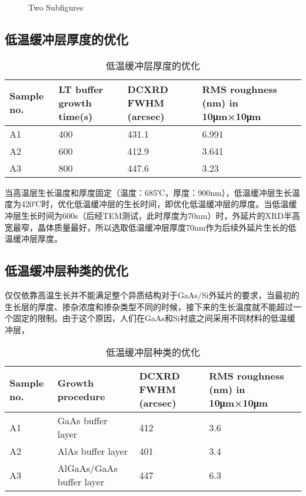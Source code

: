 \begin{figure}
	\centering
	\caption{Two Subfigures}
	\label{fig:subfig} %
\end{figure}

\subsection{低温缓冲层厚度的优化}

\begin{table*}[htbp] 
	\centering
	\caption{\label{tab:test2}低温缓冲层厚度的优化}  
	\begin{tabular}{m{}<{\centering}m{}<{\centering}m{}<{\centering}m{}<{\centering}}   
		\toprule
			Sample no. & LT buffer growth time(s) & DCXRD FWHM (arcsec) & RMS roughness (nm) in 10μm×10μm \\
		\midrule
			A1 & 400 & 431.1 & 6.991 \\
			A2 & 600 & 412.9 & 3.641 \\
			A3 & 800 & 447.6 & 3.23 \\
		\bottomrule
	\end{tabular}
\end{table*}

当高温层生长温度和厚度固定（温度：685℃，厚度：900nm），低温缓冲层生长温度为420℃时，优化低温缓冲层的生长时间，即优化低温缓冲层的厚度。当低温缓冲层生长时间为600s（后经TEM测试，此时厚度为70nm）时，外延片的XRD半高宽最窄，晶体质量最好，所以选取低温缓冲层厚度70nm作为后续外延片生长的低温缓冲层厚度。


\subsection{低温缓冲层种类的优化}

仅仅依靠高温生长并不能满足整个异质结构对于GaAs/Si外延片的要求，当最初的生长层的厚度、掺杂浓度和掺杂类型不同的时候，接下来的生长温度就不能超过一个固定的限制。由于这个原因，人们在GaAs和Si衬底之间采用不同材料的低温缓冲层，

\begin{table*}[htbp] 
	\centering
	\caption{\label{tab:test3}低温缓冲层种类的优化}  
	\begin{tabular}{m{}<{\centering}m{}<{\centering}m{}<{\centering}m{}<{\centering}}   
		\toprule
			Sample no. & Growth procedure & DCXRD FWHM (arcsec) & RMS roughness (nm) in 10μm×10μm \\
		\midrule
			A1 & GaAs buffer layer & 412 & 3.6 \\
			A2 & AlAs buffer layer & 401 & 3.4 \\
			A3 & AlGaAs/GaAs buffer layer & 447 & 6.3 \\
		\bottomrule
	\end{tabular}
\end{table*}

